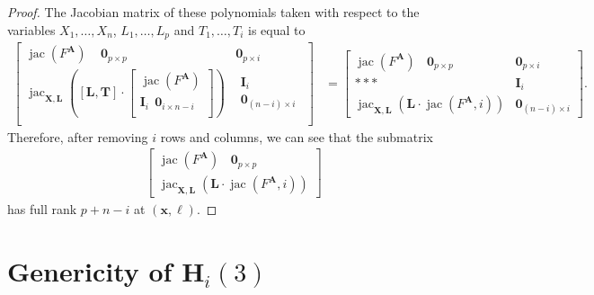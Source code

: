 \documentclass[12pt]{article}
\def\bz{{{\bm 0}}}
\def\mA{{\bm A}}
\def\xb{{\bm x}}
\DeclareMathOperator{\jac}{jac}
\def\bbm{\begin{bmatrix}}
\def\ebm{\end{bmatrix}}
\def\bmat{\begin{matrix}}
\def\emat{\end{matrix}}
\begin{document}
\begin{proof}
  The Jacobian matrix of these polynomials taken with respect to the
  variables $X_1,\dots,X_n$, $L_1,\hdots,L_p$ and $T_1,\hdots,T_i$ is
  equal to
  \begin{align*}
    \left[ 
      \begin{array}{cc}
        \jac(F^{\mA})~~~~~ \bz_{p \times p} & \bz_{p\times i}\\
        \jac_{\bm X,\bm L}\left([\bm L, \bm T ] \cdot 
        \bbm 
        \jac(F^{\mA})\\
        \bm I_i~~\bm 0_{i \times n-i} \\
        \ebm\right) & \bmat \bm I_{i}\\ \bz_{(n-i)\times i} \emat\\
      \end{array}
      \right]
    &=
    \left[ 
      \begin{array}{cc}
        \jac(F^{\mA}) ~~~~ \bz_{p \times p} & \bz_{p\times i} \\
        \ast \ast \ast & \bm I_{i}\\
    \jac_{\bm X,\bm L}\left(\bm L \cdot \jac(F^{\mA},i) \right)& \bz_{(n-i)\times i}
      \end{array}
      \right].
    \end{align*}
    Therefore, after removing $i$ rows and columns, we can see that
    the submatrix
    \begin{align}
    \left[ 
    \begin{array}{c}
    \jac(F^{\mA}) ~~~~ \bz_{p \times p}\\
    \jac_{\bm X,\bm L}\left(\bm L \cdot \jac(F^{\mA},i) \right) 
    \end{array}
    \right]
    \end{align}
    has full rank $p + n-i$ at $(\xb,\bm\ell)$. 
\end{proof}


\section{Genericity of $\textbf{H}_i(3)$}\label{ssec:Hi2}
\end{document}
